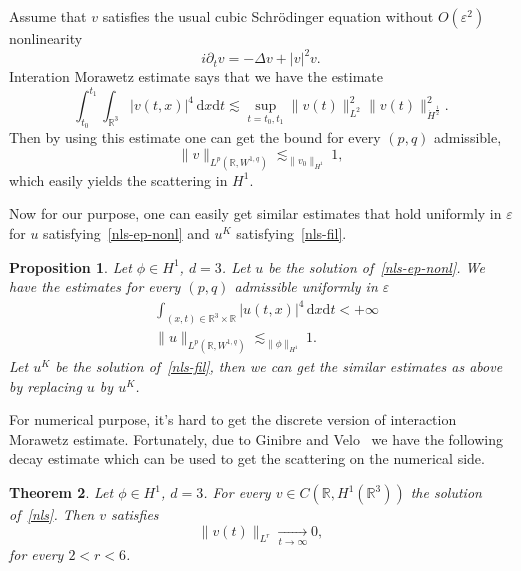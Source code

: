 \documentclass[10pt,a4paper]{article}
\newtheorem{theorem}{Theorem}[section]
\newtheorem{proposition}[theorem]{Proposition}
\begin{document}
  Assume that \(v\) satisfies the usual cubic Schr\"odinger equation without 
  \(O(\varepsilon^2)\) nonlinearity
  \begin{equation}\label{nls}
    i\partial_t v = -\Delta v + |v|^2 v.
  \end{equation}
  Interation Morawetz estimate says that we have the estimate 
  \[ \int_{t_0}^{t_1}\int_{\mathbb R^3} |v(t,x)|^4\,\mathrm{d}x\mathrm{d}t
  \lesssim \sup_{t=t_0,t_1} \|v(t)\|^2_{L^2}\|v(t)\|^2_{\dot{H}^\frac12}.\]
  Then by using this estimate one can get the bound for every \((p,q)\)
  admissible,
  \[ \|v\|_{L^p(\mathbb R,W^{1,q})} \lesssim_{\|v_0\|_{H^1}} 1,\]
  which easily yields the scattering in \(H^1\).

  Now for our purpose, one can easily get similar estimates that hold uniformly in
  \(\varepsilon\) for \(u\) satisfying~\eqref{nls-ep-nonl} and
  \(u^K\) satisfying~\eqref{nls-fil}. 
  \begin{proposition}\label{S1}
    Let \(\phi \in H^1\), \( d = 3 \). Let \( u \) be the solution 
    of~\eqref{nls-ep-nonl}. We have the estimates for every \((p,q)\) admissible 
    uniformly in \(\varepsilon\)
    \begin{equation}
      \begin{aligned}
        & \int_{(x,t)\in\mathbb R^3\times\mathbb R} |u(t,x)|^4\,\mathrm{d}x\mathrm{d}t
        < +\infty \\ 
        & \|u\|_{L^p(\mathbb R,W^{1,q})} \lesssim_{\|\phi\|_{H^1}} 1.
      \end{aligned}
    \end{equation}
    Let \(u^K\) be the solution of~\eqref{nls-fil}, then we can get the similar
    estimates as above by replacing \(u\) by \(u^K\).
  \end{proposition}

  For numerical purpose, it's hard to get the discrete version of
  interaction Morawetz estimate. Fortunately, due to Ginibre and
  Velo~\cite{GiVl85b} we have the following decay estimate which can be used to
  get the scattering on the numerical side. 
  \begin{theorem}
    Let \(\phi \in H^1\), \( d = 3 \). For every \(v\in C(\mathbb R,H^1(\mathbb
    R^3))\) the solution of~\eqref{nls}. Then \(v\) satisfies 
    \[ \|v(t)\|_{L^r} \underset{t \to \infty}{\longrightarrow} 0, \]
    for every \(2 < r < 6\).
  \end{theorem}
\end{document}
